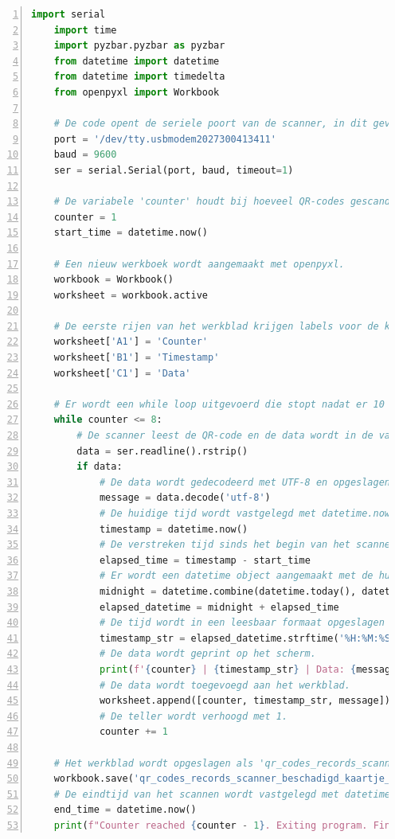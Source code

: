 \begin{lstlisting}[language=Python, caption={Python script voor experiment van nieuwe QR-code scanner.}, label=lst:nieuweQR-codeData, numbers=left]
    import serial
    import time
    import pyzbar.pyzbar as pyzbar
    from datetime import datetime
    from datetime import timedelta
    from openpyxl import Workbook
    
    # De code opent de seriele poort van de scanner, in dit geval '/dev/tty.usbmodem2027300413411', op een baudrate van 9600
    port = '/dev/tty.usbmodem2027300413411'
    baud = 9600
    ser = serial.Serial(port, baud, timeout=1)
    
    # De variabele 'counter' houdt bij hoeveel QR-codes gescand zijn. De starttijd wordt vastgelegd met datetime.now().
    counter = 1
    start_time = datetime.now()
    
    # Een nieuw werkboek wordt aangemaakt met openpyxl.
    workbook = Workbook()
    worksheet = workbook.active
    
    # De eerste rijen van het werkblad krijgen labels voor de kolommen.
    worksheet['A1'] = 'Counter'
    worksheet['B1'] = 'Timestamp'
    worksheet['C1'] = 'Data'
    
    # Er wordt een while loop uitgevoerd die stopt nadat er 10 QR-codes zijn gescand.
    while counter <= 8:
        # De scanner leest de QR-code en de data wordt in de variabele 'data' opgeslagen.
        data = ser.readline().rstrip()
        if data:
            # De data wordt gedecodeerd met UTF-8 en opgeslagen in de variabele 'message'.
            message = data.decode('utf-8')
            # De huidige tijd wordt vastgelegd met datetime.now().
            timestamp = datetime.now()
            # De verstreken tijd sinds het begin van het scannen wordt berekend.
            elapsed_time = timestamp - start_time
            # Er wordt een datetime object aangemaakt met de huidige datum en de verstreken tijd.
            midnight = datetime.combine(datetime.today(), datetime.min.time())
            elapsed_datetime = midnight + elapsed_time
            # De tijd wordt in een leesbaar formaat opgeslagen in de variabele 'timestamp_str'.
            timestamp_str = elapsed_datetime.strftime('%H:%M:%S:%f')[:-3]
            # De data wordt geprint op het scherm.
            print(f'{counter} | {timestamp_str} | Data: {message}')
            # De data wordt toegevoegd aan het werkblad.
            worksheet.append([counter, timestamp_str, message])
            # De teller wordt verhoogd met 1.
            counter += 1
    
    # Het werkblad wordt opgeslagen als 'qr_codes_records_scanner.xlsx'.
    workbook.save('qr_codes_records_scanner_beschadigd_kaartje_120lux.xlsx')
    # De eindtijd van het scannen wordt vastgelegd met datetime.now() en geprint op het scherm.
    end_time = datetime.now()
    print(f"Counter reached {counter - 1}. Exiting program. Final time of scanning: {end_time - start_time}")
\end{lstlisting}

